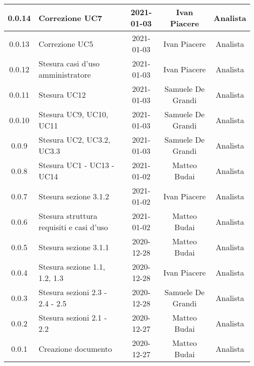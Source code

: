 \begin{center}
\begin{longtable}{|c|p{5cm}|c|c|c|}
		\hline
		0.0.14 & Correzione UC7 & 2021-01-03 & Ivan Piacere & Analista \\
		\hline
		0.0.13 & Correzione UC5 & 2021-01-03 & Ivan Piacere & Analista \\
		\hline
		0.0.12 & Stesura casi d'uso amministratore & 2021-01-03 & Ivan Piacere & Analista \\
		\hline
		0.0.11 & Stesura UC12  & 2021-01-03 & Samuele De Grandi & Analista \\
		\hline
	    0.0.10 & Stesura UC9, UC10, UC11  & 2021-01-03 & Samuele De Grandi & Analista \\
		\hline
		0.0.9 & Stesura UC2, UC3.2, UC3.3  & 2021-01-03 & Samuele De Grandi & Analista \\
		\hline
		0.0.8 & Stesura UC1 - UC13 - UC14 & 2021-01-02 & Matteo Budai & Analista \\
		\hline
		0.0.7 & Stesura sezione 3.1.2 & 2021-01-02 & Ivan Piacere & Analista\\
		\hline
		0.0.6 & Stesura struttura requisiti e casi d'uso & 2021-01-02 & Matteo Budai & Analista \\
		\hline
		0.0.5 & Stesura sezione 3.1.1 & 2020-12-28 & Matteo Budai & Analista \\
		\hline
		0.0.4 & Stesura sezione 1.1, 1.2, 1.3 & 2020-12-28 & Ivan Piacere & Analista \\
		\hline
		0.0.3 & Stesura sezioni 2.3 - 2.4 - 2.5 & 2020-12-28 & Samuele De Grandi & Analista \\
		\hline
		0.0.2 & Stesura sezioni 2.1 - 2.2 & 2020-12-27 & Matteo Budai & Analista \\
		\hline
		0.0.1 & Creazione documento & 2020-12-27 & Matteo Budai & Analista \\
		\hline
		
	\end{longtable}
\end{center}

